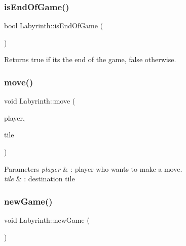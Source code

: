 \subsubsection{\texorpdfstring{isEndOfGame()}{isEndOfGame()}}
{\footnotesize\ttfamily bool Labyrinth\+::is\+End\+Of\+Game (\begin{DoxyParamCaption}{ }\end{DoxyParamCaption})}

\begin{DoxyReturn}{Returns}
true if it\textquotesingle{}s the end of the game, false otherwise. 
\end{DoxyReturn}
\mbox{\label{classLabyrinth_ae2d8d7eb36191331670ed5dada124995}} 
\subsubsection{\texorpdfstring{move()}{move()}}
{\footnotesize\ttfamily void Labyrinth\+::move (\begin{DoxyParamCaption}\item[{\mbox{\hyperlink{classPlayer}{Player}}}]{player,  }\item[{\mbox{\hyperlink{classTile}{Tile}}}]{tile }\end{DoxyParamCaption})}


\begin{DoxyParams}{Parameters}
{\em player} & \+: player who wants to make a move. \\
\hline
{\em tile} & \+: destination tile \\
\hline
\end{DoxyParams}
\mbox{\label{classLabyrinth_a550a98e5fb1d3a278527e716231f620b}} 
\subsubsection{\texorpdfstring{newGame()}{newGame()}}
{\footnotesize\ttfamily void Labyrinth\+::new\+Game (\begin{DoxyParamCaption}{ }\end{DoxyParamCaption})}

\mbox{\label{classLabyrinth_adb4f7dc7978f69919812a5dcd735da21}} 
